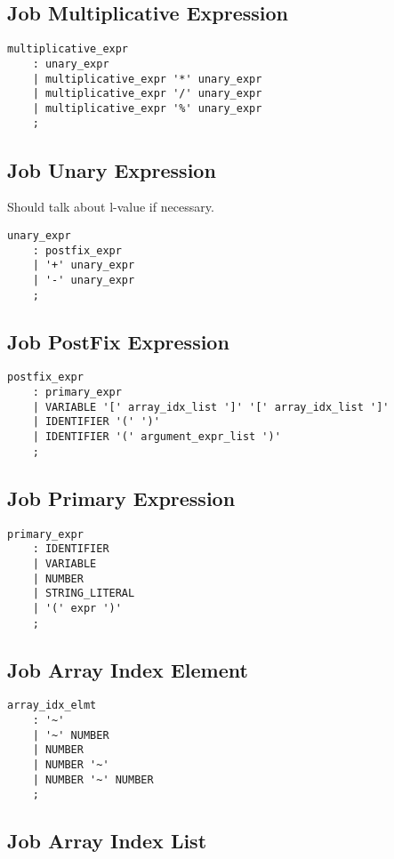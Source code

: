 \documentclass[prodmode,acmtecs]{acmsmall}
\begin{document}
\subsection{Job Multiplicative Expression}

\begin{lstlisting}
multiplicative_expr
	: unary_expr
	| multiplicative_expr '*' unary_expr
	| multiplicative_expr '/' unary_expr
	| multiplicative_expr '%' unary_expr
	;
\end{lstlisting}

\subsection{Job Unary Expression}
Should talk about l-value if necessary.

\begin{lstlisting}
unary_expr
	: postfix_expr
	| '+' unary_expr
	| '-' unary_expr
	;
\end{lstlisting}

\subsection{Job PostFix Expression}

\begin{lstlisting}
postfix_expr
	: primary_expr
	| VARIABLE '[' array_idx_list ']' '[' array_idx_list ']'
	| IDENTIFIER '(' ')'
	| IDENTIFIER '(' argument_expr_list ')'
	;
\end{lstlisting}

\subsection{Job Primary Expression}

\begin{lstlisting}
primary_expr
	: IDENTIFIER
	| VARIABLE
	| NUMBER
	| STRING_LITERAL
	| '(' expr ')'
	;
\end{lstlisting}

\subsection{Job Array Index Element}

\begin{lstlisting}
array_idx_elmt
	: '~'
	| '~' NUMBER
	| NUMBER
	| NUMBER '~'
	| NUMBER '~' NUMBER
	;
\end{lstlisting}

\subsection{Job Array Index List}
\end{document}
